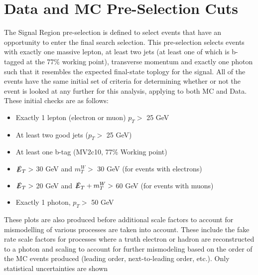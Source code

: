 \section{Data and MC Pre-Selection Cuts}
\label{sec:preselcuts}
The Signal Region pre-selection is defined to select events that have an opportunity to enter the final search selection.  This pre-selection selects events with exactly one massive lepton, at least two jets (at least one of which is b-tagged at the 77\% working point), transverse momentum and exactly one photon such that it resembles the expected final-state toplogy for the signal.  All of the events have the same initial set of criteria for determining whether or not the event is looked at any further for this analysis, applying to both MC and Data.  These initial checks are as follows:
\begin{itemize}
\item Exactly 1 lepton (electron or muon) $p_T >$ 25 GeV
\item At least two good jets ($p_T >$ 25 GeV)
\item At least one b-tag (MV2c10, 77\% Working point)
\item $\slashed{E}_T >$ 30 GeV and $m_T^W >$ 30 GeV (for events with electrons)
\item $\slashed{E}_T >$ 20 GeV and $\slashed{E}_T + m_T^W >$ 60 GeV (for events with muons)
\item Exactly 1 photon, $p_T >$ 50 GeV %
\end{itemize}

These plots are also produced before additional scale factors to account for mismodelling of various processes are taken into account.  These include the fake rate scale factors for processes where a truth electron or hadron are reconstructed to a photon and scaling to account for further mismodeling based on the order of the MC events produced (leading order, next-to-leading order, etc.).  Only statistical uncertainties are shown

